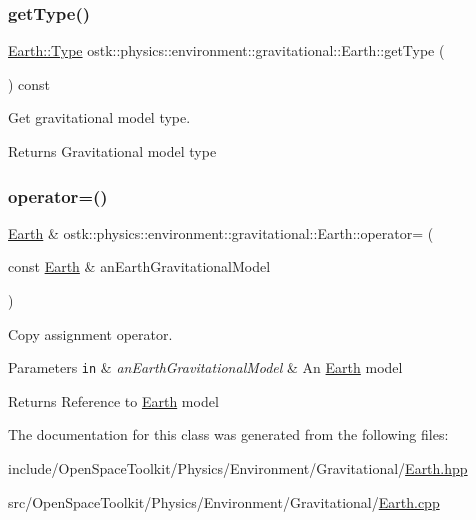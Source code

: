 \subsubsection{\texorpdfstring{get\+Type()}{getType()}}
{\footnotesize\ttfamily \hyperlink{classostk_1_1physics_1_1environment_1_1gravitational_1_1_earth_a9895df78b5c5aab5e981bf765f8c0f05}{Earth\+::\+Type} ostk\+::physics\+::environment\+::gravitational\+::\+Earth\+::get\+Type (\begin{DoxyParamCaption}{ }\end{DoxyParamCaption}) const}



Get gravitational model type. 

\begin{DoxyReturn}{Returns}
Gravitational model type 
\end{DoxyReturn}
\mbox{\label{classostk_1_1physics_1_1environment_1_1gravitational_1_1_earth_accc913e0c0a5c7c8348c13217c5de4f3}} 
\subsubsection{\texorpdfstring{operator=()}{operator=()}}
{\footnotesize\ttfamily \hyperlink{classostk_1_1physics_1_1environment_1_1gravitational_1_1_earth}{Earth} \& ostk\+::physics\+::environment\+::gravitational\+::\+Earth\+::operator= (\begin{DoxyParamCaption}\item[{const \hyperlink{classostk_1_1physics_1_1environment_1_1gravitational_1_1_earth}{Earth} \&}]{an\+Earth\+Gravitational\+Model }\end{DoxyParamCaption})}



Copy assignment operator. 


\begin{DoxyParams}[1]{Parameters}
\mbox{\tt in}  & {\em an\+Earth\+Gravitational\+Model} & An \hyperlink{classostk_1_1physics_1_1environment_1_1gravitational_1_1_earth}{Earth} model \\
\hline
\end{DoxyParams}
\begin{DoxyReturn}{Returns}
Reference to \hyperlink{classostk_1_1physics_1_1environment_1_1gravitational_1_1_earth}{Earth} model 
\end{DoxyReturn}


The documentation for this class was generated from the following files\+:\begin{DoxyCompactItemize}
\item 
include/\+Open\+Space\+Toolkit/\+Physics/\+Environment/\+Gravitational/\hyperlink{_gravitational_2_earth_8hpp}{Earth.\+hpp}\item 
src/\+Open\+Space\+Toolkit/\+Physics/\+Environment/\+Gravitational/\hyperlink{_gravitational_2_earth_8cpp}{Earth.\+cpp}\end{DoxyCompactItemize}
